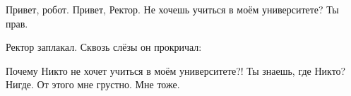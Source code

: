 \begin{dialog}
\X Привет, робот.
\R Привет, Ректор.
\X Не хочешь учиться в моём университете?
\R Ты прав.
\end{dialog}

\begin{monolog}
Ректор заплакал. Сквозь слёзы он прокричал:
\end{monolog}

\begin{dialog}
\X Почему Никто не хочет учиться в моём университете?!
\R Ты знаешь, где Никто?
\X Нигде.
\R От этого мне грустно.
\X Мне тоже.
\end{dialog}